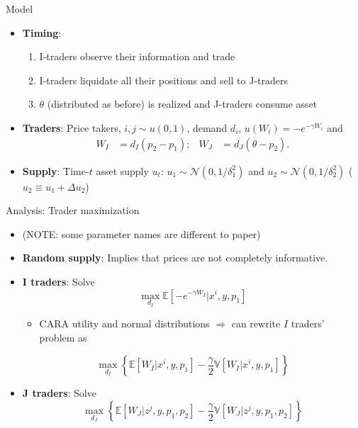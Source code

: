 \documentclass[english,10pt
,aspectratio=169
]{beamer}
\begin{document}
\begin{frame}{Model}
	\begin{itemize}
		\item \textbf{Timing}: 
		\begin{enumerate}
			\item I-traders observe their information and trade
			\item I-traders liquidate all their positions and sell to J-traders
			\item $\theta$ (distributed as before) is realized and J-traders consume asset
		\end{enumerate}
		\item \textbf{Traders}: Price takers, $i, j\sim u(0,1)$, demand $d_i$, $u(W_i)=-e^{-\gamma W_i}$ and   
		\begin{align*}
			W_I & = {d_I}(p_2-p_1); &
			W_J & = {d_J}(\theta-p_2).
		\end{align*}
		\item \textbf{Supply}: Time-$t$ asset supply  $u_t$: $u_1 \sim \mathcal{N}(0,1/\delta^2_1)$ and $u_2\sim \mathcal{N}(0,1/\delta^2_2)$ ($u_2 \equiv u_1 + \varDelta u_2$)
	\end{itemize}
\end{frame}


\begin{frame}{Analysis: Trader maximization}
	\begin{itemize}
		\item (NOTE: some parameter names are different to paper)
		\item \textbf{Random supply}: Implies that prices are not completely informative.
		\item \textbf{I traders}: Solve
		\[
			\max_{d_I} \mathbb{E}\left[ -e^{-\gamma W_I}| x^i, y, p_1 \right]
		\]
		\begin{itemize}
			\item CARA utility and normal distributions $\Rightarrow$ can rewrite $I$ traders' problem as
		\end{itemize}
		\[
			\max_{d_I} \left\{\mathbb{E}\left[W_I| x^i, y, p_1\right]-\frac{\gamma}{2} \mathbb{V}\left[W_I| x^i, y, p_1\right]\right\}
		\]
		\item \textbf{J traders}: Solve
		\[
			\max_{d_J} \left\{\mathbb{E}\left[W_J| z^j, y, p_1, p_2\right]-\frac{\gamma}{2} \mathbb{V}\left[W_J| z^j, y, p_1, p_2\right] \right\}
		\]
	\end{itemize}
\end{frame}
\end{document}
